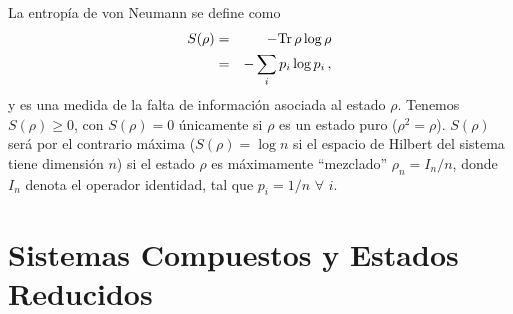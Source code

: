 La entropía de von Neumann\cite{NC.00,Wh,vn.27} se define como
\begin{eqnarray}S(\rho)&=&-{\rm Tr}\,\rho\log\rho\\&=&
-\sum_i p_i\log p_i\,,\end{eqnarray}
y es una medida de la falta de información asociada al estado $\rho$. Tenemos $S(\rho)\geq 0$, con $S(\rho)=0$ únicamente 
si $\rho$ es un estado puro ($\rho^2=\rho$).
$S(\rho)$ será por el contrario máxima ($S(\rho)=\log n$ si el espacio de Hilbert del sistema tiene dimensión $n$) si el estado $\rho$ es máximamente ``mezclado''
$\rho_n=I_n/n$, donde $I_n$ denota el operador identidad, tal que $p_i=1/n$ $\forall$ $i$.

\section{Sistemas Compuestos y Estados Reducidos}

